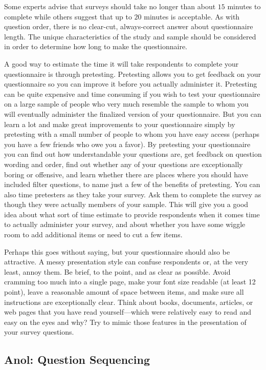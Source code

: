 Some experts advise that surveys should take no longer than about $ 15 $ minutes to complete while others suggest that up to $ 20 $ minutes is acceptable. As with question order, there is no clear-cut, always-correct answer about questionnaire length. The unique characteristics of the study and sample should be considered in order to determine how long to make the questionnaire.

A good way to estimate the time it will take respondents to complete your questionnaire is through pretesting. Pretesting allows you to get feedback on your questionnaire so you can improve it before you actually administer it. Pretesting can be quite expensive and time consuming if you wish to test your questionnaire on a large sample of people who very much resemble the sample to whom you will eventually administer the finalized version of your questionnaire. But you can learn a lot and make great improvements to your questionnaire simply by pretesting with a small number of people to whom you have easy access (perhaps you have a few friends who owe you a favor). By pretesting your questionnaire you can find out how understandable your questions are, get feedback on question wording and order, find out whether any of your questions are exceptionally boring or offensive, and learn whether there are places where you should have included filter questions, to name just a few of the benefits of pretesting. You can also time pretesters as they take your survey. Ask them to complete the survey as though they were actually members of your sample. This will give you a good idea about what sort of time estimate to provide respondents when it comes time to actually administer your survey, and about whether you have some wiggle room to add additional items or need to cut a few items.

Perhaps this goes without saying, but your questionnaire should also be attractive. A messy presentation style can confuse respondents or, at the very least, annoy them. Be brief, to the point, and as clear as possible. Avoid cramming too much into a single page, make your font size readable (at least 12 point), leave a reasonable amount of space between items, and make sure all instructions are exceptionally clear. Think about books, documents, articles, or web pages that you have read yourself—which were relatively easy to read and easy on the eyes and why? Try to mimic those features in the presentation of your survey questions.

\subsection{Anol: Question Sequencing}

